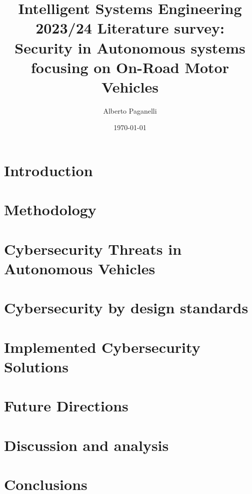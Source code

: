 \documentclass{scrartcl}
\title{\LARGE
Intelligent Systems Engineering 2023/24 \newline
\newline
Literature survey: \\
Security in Autonomous systems focusing on On-Road Motor Vehicles
}
\author{
    Alberto Paganelli \\ \emailaddr{alberto.paganelli3@studio.unibo.it}
}
\date{\today}
\begin{document}
    \maketitle
    \begin{abstract}
    
    \end{abstract}

    \newpage
    \tableofcontents
    \newpage

    \section{Introduction}\label{sec:introduction}
    
    \section{Methodology}\label{sec:methodology}
    

    \section{Cybersecurity Threats in Autonomous Vehicles}\label{sec:cybersecurity-threats-in-autonomous-vehicles}
    

    \section{Cybersecurity by design standards}\label{sec:cybersecurity-by-design-standards}
    

    \section{Implemented Cybersecurity Solutions}\label{sec:implemented-cybersecurity-solutions}
    

    \section{Future Directions}\label{sec:future-directions}
    

    \section{Discussion and analysis}\label{sec:discussion-and-analysis}
    

    \section{Conclusions}\label{sec:conclusions}
    

    ~\nocite{*}
    
    
\end{document}
